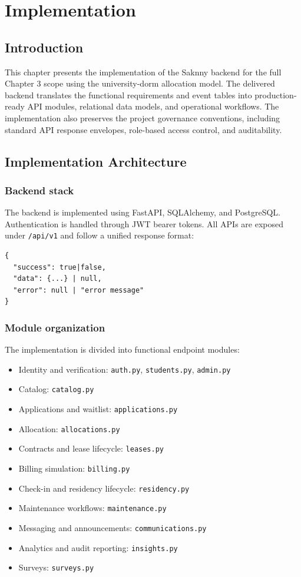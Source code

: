 \chapter{Implementation}
\label{ch:implementation}

\section{Introduction}
This chapter presents the implementation of the Saknny backend for the full Chapter 3 scope using the university-dorm allocation model. The delivered backend translates the functional requirements and event tables into production-ready API modules, relational data models, and operational workflows. The implementation also preserves the project governance conventions, including standard API response envelopes, role-based access control, and auditability.

\section{Implementation Architecture}
\subsection{Backend stack}
The backend is implemented using FastAPI, SQLAlchemy, and PostgreSQL. Authentication is handled through JWT bearer tokens. All APIs are exposed under \texttt{/api/v1} and follow a unified response format:
\begin{verbatim}
{
  "success": true|false,
  "data": {...} | null,
  "error": null | "error message"
}
\end{verbatim}

\subsection{Module organization}
The implementation is divided into functional endpoint modules:
\begin{itemize}
  \item Identity and verification: \texttt{auth.py}, \texttt{students.py}, \texttt{admin.py}
  \item Catalog: \texttt{catalog.py}
  \item Applications and waitlist: \texttt{applications.py}
  \item Allocation: \texttt{allocations.py}
  \item Contracts and lease lifecycle: \texttt{leases.py}
  \item Billing simulation: \texttt{billing.py}
  \item Check-in and residency lifecycle: \texttt{residency.py}
  \item Maintenance workflows: \texttt{maintenance.py}
  \item Messaging and announcements: \texttt{communications.py}
  \item Analytics and audit reporting: \texttt{insights.py}
  \item Surveys: \texttt{surveys.py}
\end{itemize}

